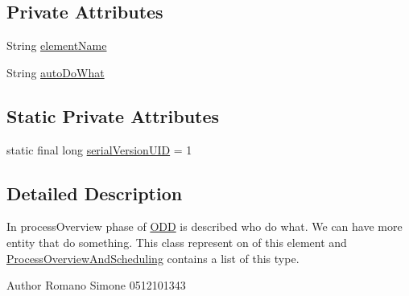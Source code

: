 \subsection*{Private Attributes}
\begin{DoxyCompactItemize}
\item 
String \hyperlink{classit_1_1isislab_1_1masonhelperdocumentation_1_1_o_d_d_1_1_process_overview_element_a42984f1c7d0ac6f1c1fe5e8900cee0b9}{element\-Name}
\item 
String \hyperlink{classit_1_1isislab_1_1masonhelperdocumentation_1_1_o_d_d_1_1_process_overview_element_a089fb4d866c8dd54cc8deca8f51127e2}{auto\-Do\-What}
\end{DoxyCompactItemize}
\subsection*{Static Private Attributes}
\begin{DoxyCompactItemize}
\item 
static final long \hyperlink{classit_1_1isislab_1_1masonhelperdocumentation_1_1_o_d_d_1_1_process_overview_element_a45b2a88aa02008be6bb02926600ac8bd}{serial\-Version\-U\-I\-D} = 1
\end{DoxyCompactItemize}


\subsection{Detailed Description}
In process\-Overview phase of \hyperlink{classit_1_1isislab_1_1masonhelperdocumentation_1_1_o_d_d_1_1_o_d_d}{O\-D\-D} is described who do what. We can have more entity that do something. This class represent on of this element and \hyperlink{classit_1_1isislab_1_1masonhelperdocumentation_1_1_o_d_d_1_1_process_overview_and_scheduling}{Process\-Overview\-And\-Scheduling} contains a list of this type. \begin{DoxyAuthor}{Author}
Romano Simone 0512101343 
\end{DoxyAuthor}


